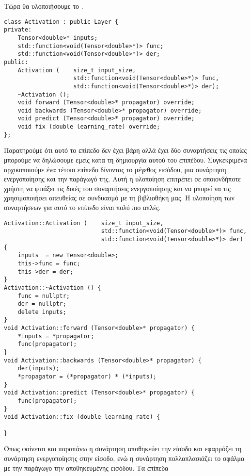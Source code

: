 Τώρα θα υλοποιήσουμε το .
\begin{otherlanguage}{english}
\begin{lstlisting}[style=cppstyle,caption= Activation layer in hpp file]
class Activation : public Layer {
private:
    Tensor<double>* inputs;
    std::function<void(Tensor<double>*)> func;
    std::function<void(Tensor<double>*)> der;
public:
    Activation (    size_t input_size,
                    std::function<void(Tensor<double>*)> func,
                    std::function<void(Tensor<double>*)> der);
    ~Activation ();
    void forward (Tensor<double>* propagator) override;
    void backwards (Tensor<double>* propagator) override;
    void predict (Tensor<double>* propagator) override;
    void fix (double learning_rate) override;
};
\end{lstlisting}
\end{otherlanguage}
Παρατηρούμε ότι αυτό το επίπεδο δεν έχει βάρη αλλά έχει δύο συναρτήσεις τις οποίες μπορούμε να δηλώσουμε εμείς κατα τη δημιουργία αυτού του επιπέδου. Συγκεκριμένα αρχικοποιούμε ένα τέτοιο επίπεδο δίνοντας το μέγεθος εισόδου, μια συνάρτηση
ενεργοποίησης και την παράγωγό της. Αυτή η υλοποίηση επιτρέπει σε οποιονδήποτε χρήστη να φτιάξει τις δικές του συναρτήσεις ενεργοποίησης και να μπορεί να τις χρησιμοποιήσει απευθείας σε συνδυασμό με τη βιβλιοθήκη μας. Η υλοποίηση των
συναρτήσεων για αυτό το επίπεδο είναι πολύ  πιο απλές.
\begin{otherlanguage}{english}
\begin{lstlisting}[style=cppstyle,caption= Activation layer in cpp file]
Activation::Activation (    size_t input_size,
                            std::function<void(Tensor<double>*)> func,
                            std::function<void(Tensor<double>*)> der) {
    inputs  = new Tensor<double>;
    this->func = func;
    this->der = der;
}
Activation::~Activation () {
    func = nullptr;
    der = nullptr;
    delete inputs;
}
void Activation::forward (Tensor<double>* propagator) {
    *inputs = *propagator;
    func(propagator);
}
void Activation::backwards (Tensor<double>* propagator) {
    der(inputs);
    *propagator = (*propagator) * (*inputs);
}
void Activation::predict (Tensor<double>* propagator) {
    func(propagator);
}
void Activation::fix (double learning_rate) {

}
\end{lstlisting}
\end{otherlanguage}
Όπως φαίνεται και παραπάνω η συνάρτηση  αποθηκεύει την είσοδο και εφαρμόζει τη συνάρτηση ενεργοποίησης στην είσοδο, ενώ η συνάρτηση  πολλαπλασιάζει το σφάλμα με την παράγωγο την αποθηκευμένης εισόδου. Τα επίπεδα
